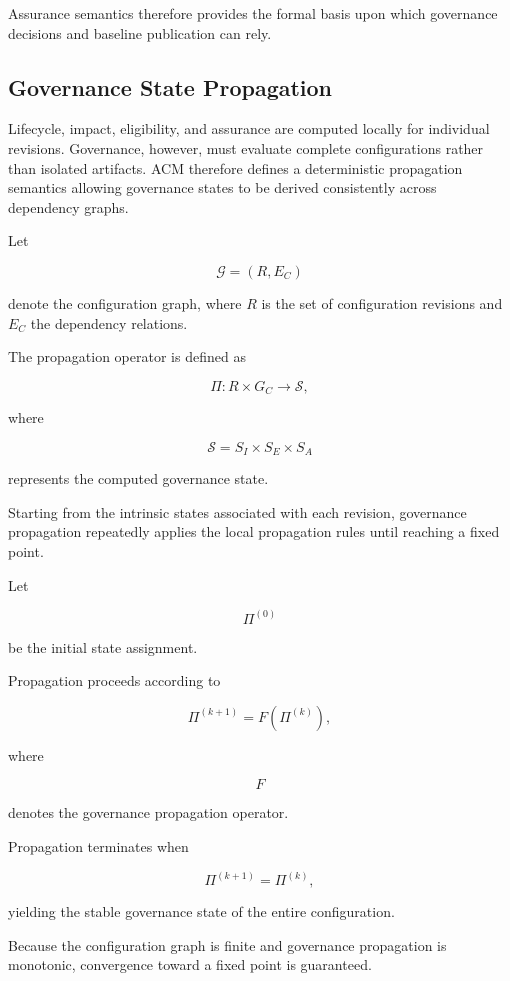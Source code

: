 \documentclass[10pt]{article}
\begin{document}
Assurance semantics therefore provides the formal basis upon which governance decisions and baseline publication can rely.

\subsection{Governance State Propagation}
\label{sec:governance_propagation}

Lifecycle, impact, eligibility, and assurance are computed locally for individual revisions. Governance, however, must evaluate complete configurations rather than isolated artifacts. ACM therefore defines a deterministic propagation semantics allowing governance states to be derived consistently across dependency graphs.

Let

\[
\mathcal{G}
=
(R,E_C)
\]

denote the configuration graph, where \(R\) is the set of configuration revisions and \(E_C\) the dependency relations.

The propagation operator is defined as

\[
\Pi
:
R\times G_C
\rightarrow
\mathcal{S},
\]

where

\[
\mathcal{S}
=
S_I
\times
S_E
\times
S_A
\]

represents the computed governance state.

Starting from the intrinsic states associated with each revision, governance propagation repeatedly applies the local propagation rules until reaching a fixed point.

Let

\[
\Pi^{(0)}
\]

be the initial state assignment.

Propagation proceeds according to

\[
\Pi^{(k+1)}
=
F
\left(
\Pi^{(k)}
\right),
\]

where

\[
F
\]

denotes the governance propagation operator.

Propagation terminates when

\[
\Pi^{(k+1)}
=
\Pi^{(k)},
\]

yielding the stable governance state of the entire configuration.

Because the configuration graph is finite and governance propagation is monotonic, convergence toward a fixed point is guaranteed.
\end{document}
